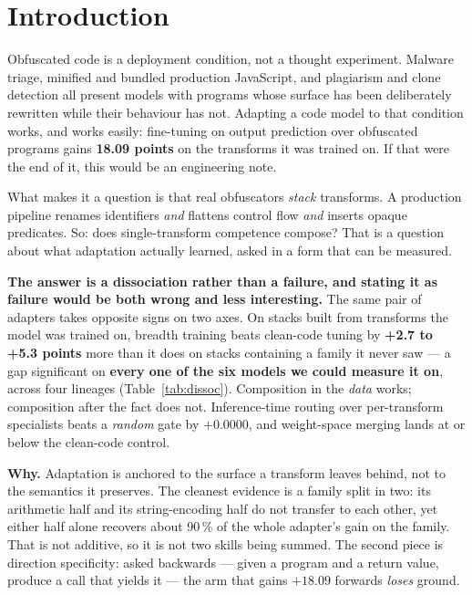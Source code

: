 \documentclass[sigconf,review,anonymous]{acmart}
\begin{document}
\section{Introduction}

Obfuscated code is a deployment condition, not a thought experiment. Malware triage, minified and
bundled production JavaScript, and plagiarism and clone detection all present models with programs
whose surface has been deliberately rewritten while their behaviour has not. Adapting a code model
to that condition works, and works easily: fine-tuning on output prediction over obfuscated programs
gains \textbf{18.09 points} on the transforms it was trained on. If that were the end of it, this
would be an engineering note.

What makes it a question is that real obfuscators \emph{stack} transforms. A production pipeline
renames identifiers \emph{and} flattens control flow \emph{and} inserts opaque predicates. So: does
single-transform competence compose? That is a question about what adaptation actually learned,
asked in a form that can be measured.

\textbf{The answer is a dissociation rather than a failure, and stating it as failure would be both
wrong and less interesting.} The same pair of adapters takes opposite signs on two axes. On stacks
built from transforms the model was trained on, breadth training beats clean-code tuning by
\textbf{+2.7 to +5.3 points} more than it does on stacks containing a family it never saw --- a gap
significant on \textbf{every one of the six models we could measure it on}, across four lineages
(Table~\ref{tab:dissoc}). Composition in the \emph{data} works; composition after the fact does
not. Inference-time routing over per-transform specialists beats a \emph{random} gate by
$+0.0000$, and weight-space merging lands at or below the clean-code control.

\textbf{Why.} Adaptation is anchored to the surface a transform leaves behind, not to the semantics
it preserves. The cleanest evidence is a family split in two: its arithmetic half and its
string-encoding half do not transfer to each other, yet either half alone recovers about 90\,\% of
the whole adapter's gain on the family. That is not additive, so it is not two skills being summed.
The second piece is direction specificity: asked backwards --- given a program and a return value,
produce a call that yields it --- the arm that gains $+18.09$ forwards \emph{loses} ground.
\end{document}
